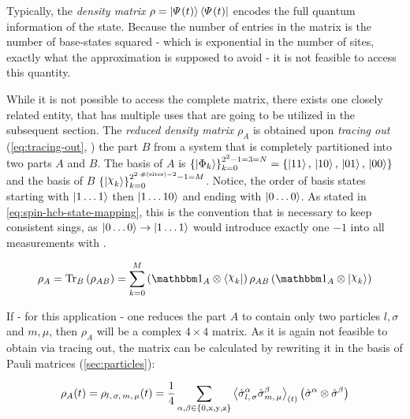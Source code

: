 Typically, the \emph{density matrix} $\rho = \ketpsiof[]{t}\brapsiof[]{t}$ encodes the full quantum information of the state. 
Because the number of entries in the matrix is the number of base-states squared - which is exponential in the number of sites, exactly what the approximation is supposed to avoid - it is not feasible to access this quantity.

While it is not possible to access the complete matrix, there exists one closely related entity, that has multiple uses that are going to be utilized in the subsequent section.
The \emph{reduced density matrix} $\rho_A$ is obtained upon \emph{tracing out} (\autoref{eq:tracing-out}, \cite{partialTraceEntanglementOfSubsystemsBlochVector}) the part $B$ from a system that is completely partitioned into two parts $A$ and $B$.
The basis of $A$ is $\left\{\ketN[\Phi_k]\right\}_{k=0}^{2^{2}-1 = 3 = N} = \left\{\ketN[11],\,\ketN[10],\,\ketN[01],\,\ketN[00]\right\}$ and the basis of $B$ $\left\{\ketN[\Chi_k]\right\}_{k=0}^{2^{2 \cdot \#\left(\text{sites}\right) - 2}-1 = M}$.
Notice, the order of basis states starting with $\ketN[1\dots1]$ then $\ketN[1\dots10]$ and ending with $\ketN[0\dots0]$. As stated in \autoref{eq:spin-hcb-state-mapping}, this is the convention that is necessary to keep consistent sings, as $\ketN[0\dots0] \rightarrow \ketN[1\dots1]$ would introduce exactly one $-1$ into all measurements with .

\begin{equation}
    \label{eq:tracing-out}
    \rho_A = \partialTrace{B}{\rho_{AB}} = \sum\limits_{k=0}^{M} \left(\one[A]\otimes\braN[\Chi_k] \right)\rho_{AB}\left(\one[A]\otimes\ketN[\Chi_k]\right)
\end{equation}

If - for this application - one reduces the part $A$ to contain only two particles $l, \sigma$ and $m, \mu$, then $\rho_A$ will be a complex $4\times 4$ matrix.
As it is again not feasible to obtain via tracing out, the matrix can be calculated by rewriting it in the basis of Pauli matrices (\ref{sec:particles}):

\begin{equation}
    \label{eq:reduced-density-matrix-via-paulis}
    \rho_A (t) = \rho_{l,\,\sigma,\,m,\,\mu} (t) = \frac{1}{4} \sum\limits_{\alpha,\beta\in\left\{0,\text{x},\text{y},\text{z}\right\}}
    \timeExpectationVal{ \pauli[l,\,\sigma]{$\alpha$}\pauli[m,\,\mu]{$\beta$} } \left(\pauli[]{$\alpha$}\otimes\pauli[]{$\beta$}\right)
\end{equation}

